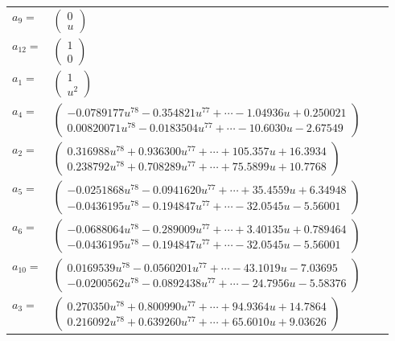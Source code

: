 \documentclass[1p]{elsarticle_modified}
\theoremstyle{definition}
\begin{document}
\begin{tabular}{m{7pt} m{180pt} m{7pt} m{180pt} }
\flushright $a_{9}=$&$\begin{pmatrix}0\\u\end{pmatrix}$ \\
\flushright $a_{12}=$&$\begin{pmatrix}1\\0\end{pmatrix}$ \\
\flushright $a_{1}=$&$\begin{pmatrix}1\\u^2\end{pmatrix}$ \\
\flushright $a_{4}=$&$\begin{pmatrix}-0.0789177 u^{78}-0.354821 u^{77}+\cdots-1.04936 u+0.250021\\0.00820071 u^{78}-0.0183504 u^{77}+\cdots-10.6030 u-2.67549\end{pmatrix}$ \\
\flushright $a_{2}=$&$\begin{pmatrix}0.316988 u^{78}+0.936300 u^{77}+\cdots+105.357 u+16.3934\\0.238792 u^{78}+0.708289 u^{77}+\cdots+75.5899 u+10.7768\end{pmatrix}$ \\
\flushright $a_{5}=$&$\begin{pmatrix}-0.0251868 u^{78}-0.0941620 u^{77}+\cdots+35.4559 u+6.34948\\-0.0436195 u^{78}-0.194847 u^{77}+\cdots-32.0545 u-5.56001\end{pmatrix}$ \\
\flushright $a_{6}=$&$\begin{pmatrix}-0.0688064 u^{78}-0.289009 u^{77}+\cdots+3.40135 u+0.789464\\-0.0436195 u^{78}-0.194847 u^{77}+\cdots-32.0545 u-5.56001\end{pmatrix}$ \\
\flushright $a_{10}=$&$\begin{pmatrix}0.0169539 u^{78}-0.0560201 u^{77}+\cdots-43.1019 u-7.03695\\-0.0200562 u^{78}-0.0892438 u^{77}+\cdots-24.7956 u-5.58376\end{pmatrix}$ \\
\flushright $a_{3}=$&$\begin{pmatrix}0.270350 u^{78}+0.800990 u^{77}+\cdots+94.9364 u+14.7864\\0.216092 u^{78}+0.639260 u^{77}+\cdots+65.6010 u+9.03626\end{pmatrix}$ \\

\end{tabular}
\end{document}
